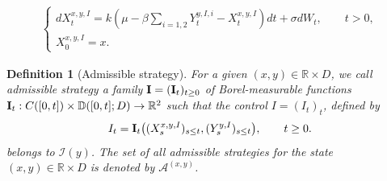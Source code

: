 \documentclass[10pt,a4paper]{amsart}
\newtheorem{definition}{Definition}
\newcommand{\NCL}[1]{\mathbb{D} ([0,{#1}];D)}
\def \R {\mathbb{R}}
\def \b {{\beta}}
\newcommand\contr{{\bf I}}
\begin{document}
\begin{align}\label{model}
\begin{cases}
dX^{x,y,I}_t=k\left(\mu-\b \sum_{i=1,2}Y_{t}^{y,I,i}-X^{x,y,I}_t\right)dt+\sigma dW_t, \qquad t>0,\\
X^{x,y,I}_0=x.
\end{cases}
\end{align}

\begin{definition}[Admissible strategy]\label{def:markov_strategy}
For a given $(x,y)\in \R\times D$, we call \emph{admissible strategy} a family $\contr = (\contr_t)_{t\geq 0}$ of Borel-measurable functions $\contr_t:  C([0,t])\times \NCL{t} \to \R^2$ such that the control $I = (I_t)_t$, defined by
\begin{equation}\label{eq:contr_markov}
I_t = \contr_t\big((X^{x,y,I}_s)_{s\leq t}, (Y^{y,I}_{s})_{s\leq t}\big), \qquad t\geq 0.
\end{equation}
belongs to $\mathcal{I}(y)$. The set of all admissible strategies for the state $(x,y)\in \R\times D$ is denoted by $\mathcal{A}^{(x,y)}$. %
\end{definition}
\end{document}
